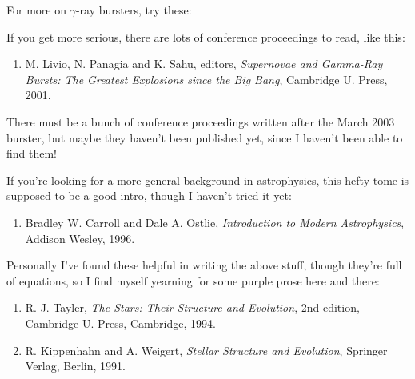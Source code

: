 \documentclass{article}
\def\tightlist{}
\renewcommand{\texttt}[1]{%
  \begingroup
  \ttfamily
  \begingroup\lccode`~=`/\lowercase{\endgroup\def~}{/\discretionary{}{}{}}%
  \begingroup\lccode`~=`[\lowercase{\endgroup\def~}{[\discretionary{}{}{}}%
  \begingroup\lccode`~=`.\lowercase{\endgroup\def~}{.\discretionary{}{}{}}%
  \catcode`/=\active\catcode`[=\active\catcode`.=\active
  \scantokens{#1\noexpand}%
  \endgroup
}
\begin{document}
For more on \(\gamma\)-ray bursters, try these:


If you get more serious, there are lots of conference proceedings to
read, like this:

\begin{enumerate}
\def\labelenumi{\arabic{enumi})}
\setcounter{enumi}{10}
\tightlist
\item
  M. Livio, N. Panagia and K. Sahu, editors, \emph{Supernovae and
  Gamma-Ray Bursts: The Greatest Explosions since the Big Bang},
  Cambridge U. Press, 2001.
\end{enumerate}

There must be a bunch of conference proceedings written after the March
2003 burster, but maybe they haven't been published yet, since I haven't
been able to find them!

If you're looking for a more general background in astrophysics, this
hefty tome is supposed to be a good intro, though I haven't tried it
yet:

\begin{enumerate}
\def\labelenumi{\arabic{enumi})}
\setcounter{enumi}{11}
\tightlist
\item
  Bradley W. Carroll and Dale A. Ostlie, \emph{Introduction to Modern
  Astrophysics}, Addison Wesley, 1996.
\end{enumerate}

Personally I've found these helpful in writing the above stuff, though
they're full of equations, so I find myself yearning for some purple
prose here and there:

\begin{enumerate}
\def\labelenumi{\arabic{enumi})}
\setcounter{enumi}{12}
\item
  R. J. Tayler, \emph{The Stars: Their Structure and Evolution}, 2nd
  edition, Cambridge U. Press, Cambridge, 1994.
\item
  R. Kippenhahn and A. Weigert, \emph{Stellar Structure and Evolution},
  Springer Verlag, Berlin, 1991.
\end{enumerate}
\end{document}
